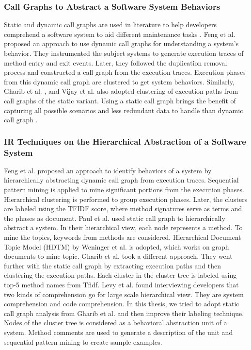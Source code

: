 \subsubsection{Call Graphs to Abstract a Software System Behaviors}

Static and dynamic call graphs are used in literature to help developers comprehend a software system to aid different maintenance tasks \cite{feng2018hierarchicalExecutionComprehension, gharibi2018automaticStaticCluster, xin2019identifyingFeaturesExecution}. Feng et al. \cite{feng2018hierarchicalExecutionComprehension} proposed an approach to use dynamic call graphs for understanding a system's behavior. They instrumented the subject systems to generate execution traces of method entry and exit events. Later, they followed the duplication removal process and constructed a call graph from the execution traces. Execution phases from this dynamic call graph are clustered to get system behaviors. Similarly, Gharib et al. \cite{gharibi2018automaticStaticCluster}, and Vijay et al. \cite{walunj2019graphevoEvolutionCall} also adopted clustering of execution paths from call graphs of the static variant. Using a static call graph brings the benefit of capturing all possible scenarios and less redundant data to handle than dynamic call graph \cite{gharibi2018automaticStaticCluster}. 

\subsubsection{IR Techniques on the Hierarchical Abstraction of a Software System}
Feng et al. \cite{feng2018hierarchicalExecutionComprehension} proposed an approach to identify behaviors of a system by hierarchically abstracting dynamic call graph from execution traces. Sequential pattern mining is applied to mine significant portions from the execution phases. Hierarchical clustering is performed to group execution phases. Later, the clusters are labeled using the TFIDF score, where method signatures serve as terms and the phases as document. 
Paul et al. \cite{mcburney2014improvingTopicSummarize} used static call graph to hierarchically abstract a system. In their hierarchical view, each node represents a method. To mine the topics, keywords from methods are considered. Hierarchical Document Topic Model (HDTM) by \cite{weninger2012documentTopicHierarchies} Weninger et al. is adopted, which works on graph documents to mine topic. Gharib et al. \cite{gharibi2018automaticStaticCluster} took a different approach. They went further with the static call graph by extracting execution paths and then clustering the execution paths. Each cluster in the cluster tree is labeled using top-5 method names from Tfidf. Levy et al. \cite{levy2019understandingLargeHierarchical} found interviewing developers that two kinds of comprehension go for large scale hierarchical view. They are system comprehension and code comprehension. In this thesis, we tried to adopt static call graph analysis from Gharib et al. and then improve their labeling technique. Nodes of the cluster tree is considered as a behavioral abstraction unit of a system. Method comments are used to generate a description of the unit and sequential pattern mining to create sample examples. 


